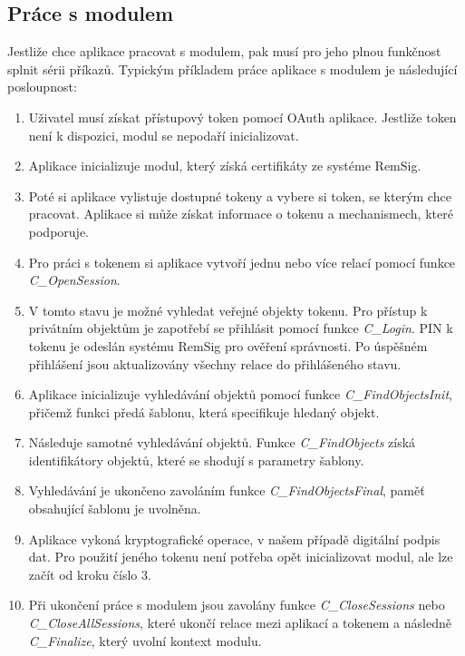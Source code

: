 \documentclass[]{fithesis3}
\begin{document}
	\subsection{Práce s modulem}
	
	Jestliže chce aplikace pracovat s modulem, pak musí pro jeho plnou funkčnost splnit sérii 			příkazů. Typickým příkladem práce aplikace s modulem je následující posloupnost:
	\begin{enumerate}
		\item Uživatel musí získat přístupový token pomocí OAuth aplikace. Jestliže token není k 			dispozici, modul se nepodaří inicializovat.
		\item Aplikace inicializuje modul, který získá certifikáty ze systéme RemSig.
		\item Poté si aplikace vylistuje dostupné tokeny a vybere si token, se kterým chce 				pracovat. Aplikace si může získat informace o tokenu a mechanismech, které podporuje.
		\item Pro práci s tokenem si aplikace vytvoří jednu nebo více relací pomocí funkce 					\textit{C\_OpenSession}.
		\item V tomto stavu je možné vyhledat veřejné objekty tokenu. Pro přístup k privátním 			objektům je zapotřebí se přihlásit pomocí funkce \textit{C\_Login}. PIN k tokenu je 				odeslán systému RemSig pro ověření správnosti. Po úspěšném přihlášení jsou 					aktualizovány všechny relace do přihlášeného stavu.
		\item Aplikace inicializuje vyhledávání objektů pomocí funkce \textit{C\_FindObjectsInit}, 			přičemž funkci předá šablonu, která specifikuje hledaný objekt. 
		\item Následuje samotné vyhledávání objektů. Funkce \textit{C\_FindObjects} získá 				identifikátory objektů, které se shodují s parametry šablony.
		\item Vyhledávání je ukončeno zavoláním funkce \textit{C\_FindObjectsFinal}, paměť 				obsahující šablonu je uvolněna.
		\item Aplikace vykoná kryptografické operace, v našem případě digitální podpis dat. Pro 			použití jeného tokenu není potřeba opět inicializovat modul, ale lze začít od kroku číslo 				3.
		\item Při ukončení práce s modulem jsou zavolány funkce \textit{C\_CloseSessions} nebo 		\textit{C\_CloseAllSessions}, které ukončí relace mezi aplikací a tokenem a následně 				\textit{C\_Finalize}, který uvolní kontext modulu.
	\end{enumerate}
\end{document}
